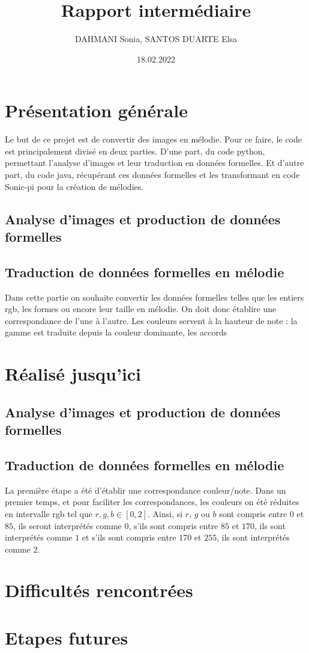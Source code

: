 \documentclass{article}
\title{Rapport intermédiaire}
\author{DAHMANI Sonia, SANTOS DUARTE Elsa}
\date{18.02.2022}
\begin{document}
	
\maketitle

\section{Présentation générale}
	Le but de ce projet est de convertir des images en mélodie. Pour ce faire, le code est principalement divisé en deux parties. D'une part, du code python, permettant l'analyse d'images et leur traduction en données formelles. Et d'autre part, du code java, récupérant ces données formelles et les transformant en code Sonic-pi pour la création de mélodies.
	\subsection{Analyse d'images et production de données formelles}
	\subsection{Traduction de données formelles en mélodie}
		Dans cette partie on souhaite convertir les données formelles telles que les entiers rgb, les formes ou encore leur taille en mélodie. On doit donc établire une correspondance de l'une à l'autre. Les couleurs servent à la hauteur de note : la gamme est traduite depuis la couleur dominante, les accords 
\section{Réalisé jusqu'ici}
	\subsection{Analyse d'images et production de données formelles}
	\subsection{Traduction de données formelles en mélodie}
		La première étape a été d'établir une correspondance couleur/note. Dans un premier temps, et pour faciliter les correspondances, les couleurs on été réduites en intervalle rgb tel que $r,g,b \in [0,2]$. Ainsi, si $r$, $g$ ou $b$ sont compris entre $0$ et $85$, ils seront interprétés comme $0$, s'ils sont compris entre $85$ et $170$, ils sont interprétés comme $1$ et s'ils sont compris entre $170$ et $255$, ils sont interprétés comme $2$. 
\section{Difficultés rencontrées}
\section{Etapes futures}
\end{document}
